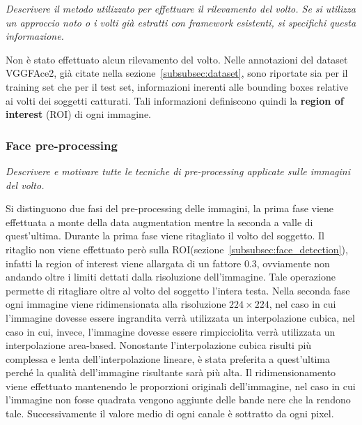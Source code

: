 \emph{Descrivere il metodo utilizzato per effettuare il rilevamento del volto. Se si utilizza un approccio noto o i volti già estratti con framework esistenti, si specifichi questa informazione.}

Non è stato effettuato alcun rilevamento del volto. Nelle annotazioni del dataset VGGFAce2, già citate nella sezione~\ref{subsubsec:dataset}, sono riportate sia per il training set che per il test set, informazioni inerenti alle bounding boxes relative ai volti dei soggetti catturati. Tali informazioni definiscono quindi la \textbf{region of interest} (ROI) di ogni immagine.

\subsubsection{Face pre-processing} 

\emph{Descrivere e motivare tutte le tecniche di pre-processing applicate sulle immagini del volto.}

Si distinguono due fasi del pre-processing delle immagini, la prima fase viene effettuata a monte della data augmentation mentre la seconda a valle di quest'ultima.
Durante la prima fase viene ritagliato il volto del soggetto. Il ritaglio non viene effettuato però sulla ROI(sezione~\ref{subsubsec:face_detection}), infatti la region of interest viene allargata di un fattore $0.3$, ovviamente non andando oltre i limiti dettati dalla risoluzione dell'immagine. Tale operazione permette di ritagliare oltre al volto del soggetto l'intera testa.
Nella seconda fase ogni immagine viene ridimensionata alla risoluzione $224 \times 224$, nel caso in cui l'immagine dovesse essere ingrandita verrà utilizzata un interpolazione cubica, nel caso in cui, invece, l'immagine dovesse essere rimpicciolita verrà utilizzata un interpolazione area-based. Nonostante l'interpolazione cubica risulti più complessa e lenta dell'interpolazione lineare, è stata preferita a quest'ultima perché la qualità dell'immagine risultante sarà più alta. Il ridimensionamento viene effettuato mantenendo le proporzioni originali dell'immagine, nel caso in cui l'immagine non fosse quadrata vengono aggiunte delle bande nere che la rendono tale. Successivamente il valore medio di ogni canale è sottratto da ogni pixel.

